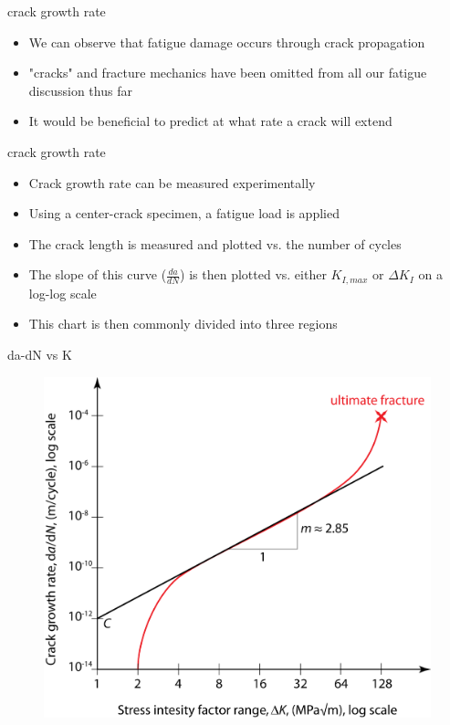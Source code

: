 \documentclass[10pt]{beamer}
\begin{document}
\begin{frame}{crack growth rate}
	\begin{itemize}[<+->]
		\item We can observe that fatigue damage occurs through crack propagation
		\item "cracks" and fracture mechanics have been omitted from all our fatigue discussion thus far
		\item It would be beneficial to predict at what rate a crack will extend
	\end{itemize}
\end{frame}

\begin{frame}{crack growth rate}
	\begin{itemize}[<+->]
		\item Crack growth rate can be measured experimentally 
		\item Using a center-crack specimen, a fatigue load is applied
		\item The crack length is measured and plotted vs. the number of cycles
		\item The slope of this curve ($\frac{da}{dN}$) is then plotted vs. either $K_{I,max}$ or $\Delta K_I$ on a log-log scale
		\item This chart is then commonly divided into three regions
	\end{itemize}
\end{frame}

\begin{frame}{da-dN vs K}	
	\begin{figure}
		\centering
		\includegraphics[width=0.7\linewidth]{../Figures/da-dn}
		\label{fig:da-dn}
	\end{figure}
\end{frame}
\end{document}
